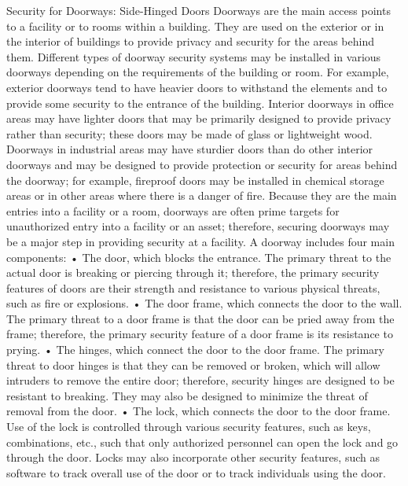 \documentclass{article}
\begin{document}
Security for Doorways: Side-Hinged Doors Doorways are the main access
points to a facility or to rooms within a building. They are used on the
exterior or in the interior of buildings to provide privacy and security
for the areas behind them. Different types of doorway security systems
may be installed in various doorways depending on the requirements of
the building or room. For example, exterior doorways tend to have
heavier doors to withstand the elements and to provide some security to
the entrance of the building. Interior doorways in office areas may have
lighter doors that may be primarily designed to provide privacy rather
than security; these doors may be made of glass or lightweight wood.
Doorways in industrial areas may have sturdier doors than do other
interior doorways and may be designed to provide protection or security
for areas behind the doorway; for example, fireproof doors may be
installed in chemical storage areas or in other areas where there is a
danger of fire. Because they are the main entries into a facility or a
room, doorways are often prime targets for unauthorized entry into a
facility or an asset; therefore, securing doorways may be a major step
in providing security at a facility. A doorway includes four main
components: • The door, which blocks the entrance. The primary threat to
the actual door is breaking or piercing through it; therefore, the
primary security features of doors are their strength and resistance to
various physical threats, such as fire or explosions. • The door frame,
which connects the door to the wall. The primary threat to a door frame
is that the door can be pried away from the frame; therefore, the
primary security feature of a door frame is its resistance to prying. •
The hinges, which connect the door to the door frame. The primary threat
to door hinges is that they can be removed or broken, which will allow
intruders to remove the entire door; therefore, security hinges are
designed to be resistant to breaking. They may also be designed to
minimize the threat of removal from the door. • The lock, which connects
the door to the door frame. Use of the lock is controlled through
various security features, such as keys, combinations, etc., such that
only authorized personnel can open the lock and go through the door.
Locks may also incorporate other security features, such as software to
track overall use of the door or to track individuals using the door.
\end{document}
